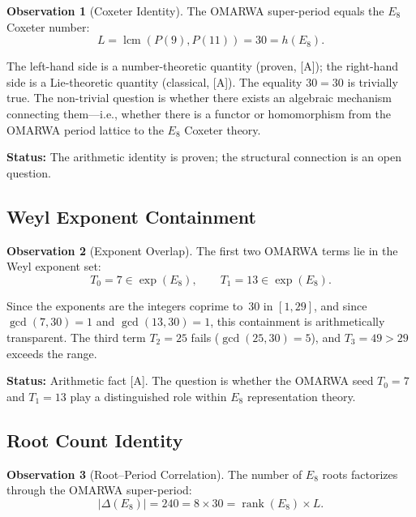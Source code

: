 \documentclass[11pt, a4paper]{article}
\theoremstyle{plain}
\theoremstyle{definition}
\newtheorem{observation}{Observation}[section]
\theoremstyle{remark}
\DeclareMathOperator{\lcm}{lcm}
\DeclareMathOperator{\rank}{rank}
\begin{document}
\begin{observation}[Coxeter Identity]
\label{obs:coxeter}
The OMARWA super-period equals the $E_8$ Coxeter number:
\begin{equation}
L = \lcm(P(9), P(11)) = 30 = h(E_8).
\end{equation}
\end{observation}

The left-hand side is a number-theoretic quantity (proven, [A]);
the right-hand side is a Lie-theoretic quantity (classical, [A]).
The equality $30 = 30$ is trivially true. The non-trivial question is
whether there exists an algebraic mechanism connecting them---i.e.,
whether there is a functor or homomorphism from the OMARWA period
lattice to the $E_8$ Coxeter theory.

\textbf{Status:} The arithmetic identity is proven; the structural
connection is an open question.

\subsection{Weyl Exponent Containment}

\begin{observation}[Exponent Overlap]
\label{obs:weyl}
The first two OMARWA terms lie in the Weyl exponent set:
\begin{equation}
T_0 = 7 \in \exp(E_8), \qquad T_1 = 13 \in \exp(E_8).
\end{equation}
\end{observation}

Since the exponents are the integers coprime to~30 in $[1,29]$, and
since $\gcd(7, 30) = 1$ and $\gcd(13, 30) = 1$, this containment is
arithmetically transparent. The third term $T_2 = 25$ fails
($\gcd(25, 30) = 5$), and $T_3 = 49 > 29$ exceeds the range.

\textbf{Status:} Arithmetic fact [A]. The question is whether the
OMARWA seed $T_0 = 7$ and $T_1 = 13$ play a distinguished role
within $E_8$ representation theory.

\subsection{Root Count Identity}

\begin{observation}[Root--Period Correlation]
\label{obs:roots}
The number of $E_8$ roots factorizes through the OMARWA super-period:
\begin{equation}
|\Delta(E_8)| = 240 = 8 \times 30 = \rank(E_8) \times L.
\end{equation}
\end{observation}
\end{document}

